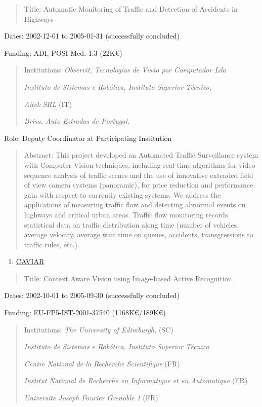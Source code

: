 \documentclass[
]{article}
\begin{document}
\begin{quote}
Title: Automatic Monitoring of Traffic and Detection of Accidents in
Highways
\end{quote}

Dates: 2002-12-01 to 2005-01-31 (successfully concluded)

Funding: ADI, POSI Med. 1.3 (22K€)

\begin{quote}
Institutions: \emph{Observit, Tecnologias de Visão por Computador Lda}

\emph{Instituto de Sistemas e Robótica, Instituto Superior Técnico,}

\emph{Aitek SRL} (IT)

\emph{Brisa, Auto-Estradas de Portugal.}
\end{quote}

Role: Deputy Coordinator at Participating Institution

\begin{quote}
Abstract: This project developed an Automated Traffic Surveillance
system with Computer Vision techniques, including real-time algorithms
for video sequence analysis of traffic scenes and the use of innovative
extended field of view camera systems (panoramic), for price reduction
and performance gain with respect to currently existing systems. We
address the applications of measuring traffic flow and detecting
abnormal events on highways and critical urban areas. Traffic flow
monitoring records statistical data on traffic distribution along time
(number of vehicles, average velocity, average wait time on queues,
accidents, transgressions to traffic rules, etc.).
\end{quote}

\begin{enumerate}
\def\labelenumi{\arabic{enumi}.}
\setcounter{enumi}{16}
\item
  \ul{CAVIAR}
\end{enumerate}

\begin{quote}
Title: Context Aware Vision using Image-based Active Recognition
\end{quote}

Dates: 2002-10-01 to 2005-09-30 (successfully concluded)

Funding: EU-FP5-IST-2001-37540 (1168K€/189K€)

\begin{quote}
Institutions: \emph{The University of Edimburgh,} (SC)

\emph{Instituto de Sistemas e Robótica, Instituto Superior Técnico}

\emph{Centre National de la Recherche Scientifique} (FR)

\emph{Institut National de Recherche en Informatique et en Automatique}
(FR)

\emph{Universite Joseph Fourier Grenoble 1} (FR)
\end{quote}
\end{document}
